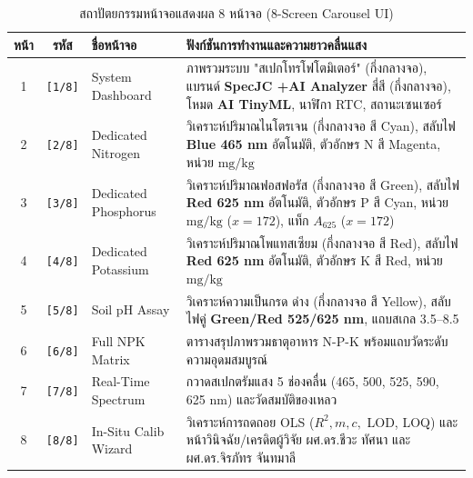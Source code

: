 \begin{table}[H]
\centering
\caption{สถาปัตยกรรมหน้าจอแสดงผล 8 หน้าจอ (8-Screen Carousel UI)}
\label{tab:screens_8_overview}
\begin{tabularx}{\textwidth}{cclX}
\toprule
\textbf{หน้า} & \textbf{รหัส} & \textbf{ชื่อหน้าจอ} & \textbf{ฟังก์ชันการทำงานและความยาวคลื่นแสง} \\
\midrule
1 & \texttt{[1/8]} & System Dashboard & ภาพรวมระบบ "สเปกโทรโฟโตมิเตอร์" (กึ่งกลางจอ), แบรนด์ \textbf{SpecJC +AI Analyzer} สี่สี (กึ่งกลางจอ), โหมด \textbf{AI TinyML}, นาฬิกา RTC, สถานะเซนเซอร์ \\
2 & \texttt{[2/8]} & Dedicated Nitrogen & วิเคราะห์ปริมาณไนโตรเจน (กึ่งกลางจอ สี Cyan), สลับไฟ \textbf{Blue 465 nm} อัตโนมัติ, ตัวอักษร N สี Magenta, หน่วย $\text{mg/kg}$ \\
3 & \texttt{[3/8]} & Dedicated Phosphorus & วิเคราะห์ปริมาณฟอสฟอรัส (กึ่งกลางจอ สี Green), สลับไฟ \textbf{Red 625 nm} อัตโนมัติ, ตัวอักษร P สี Cyan, หน่วย $\text{mg/kg}$ ($x=172$), แท็ก $A_{625}$ ($x=172$) \\
4 & \texttt{[4/8]} & Dedicated Potassium & วิเคราะห์ปริมาณโพแทสเซียม (กึ่งกลางจอ สี Red), สลับไฟ \textbf{Red 625 nm} อัตโนมัติ, ตัวอักษร K สี Red, หน่วย $\text{mg/kg}$ \\
5 & \texttt{[5/8]} & Soil pH Assay & วิเคราะห์ความเป็นกรด ด่าง (กึ่งกลางจอ สี Yellow), สลับไฟคู่ \textbf{Green/Red 525/625 nm}, แถบสเกล 3.5--8.5 \\
6 & \texttt{[6/8]} & Full NPK Matrix & ตารางสรุปภาพรวมธาตุอาหาร N-P-K พร้อมแถบวัดระดับความอุดมสมบูรณ์ \\
7 & \texttt{[7/8]} & Real-Time Spectrum & กวาดสเปกตรัมแสง 5 ช่องคลื่น (465, 500, 525, 590, 625 nm) และวัดสมบัติของเหลว \\
8 & \texttt{[8/8]} & In-Situ Calib Wizard & วิเคราะห์การถดถอย OLS ($R^2, m, c,$ LOD, LOQ) และหน้าวินิจฉัย/เครดิตผู้วิจัย ผศ.ดร.ชีวะ ทัศนา และ ผศ.ดร.จิรภัทร จันทมาลี \\
\bottomrule
\end{tabularx}
\end{table}

